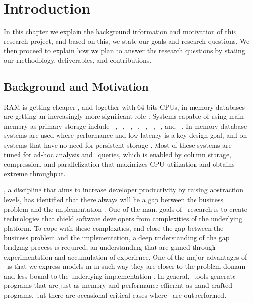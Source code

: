 \chapter{Introduction}
\label{chap:introduction}
In this chapter we explain the background information and motivation of this research project, and based on this, we state our goals and research questions. We then proceed to explain how we plan to answer the research questions by stating our methodology, deliverables, and contributions.
\clearpage

\section{Background and Motivation}
\label{sec:Background and Motivation}
RAM is getting cheaper \cite{Exasol2014-xh}, and together with 64-bits CPUs, in-memory databases are getting an increasingly more significant role \cite{Delaney2014-ip}. Systems capable of using main memory as primary storage include \oracle~\cite{Lahiri2015-mz}, \saph~\cite{Farber2012-vh}, \gorilla~\cite{Pelkonen2015-ko}, \qlikview~\cite{Qlik2011-ef}, \tableau~\cite{Kamkolkar2015-iq}, \monetdb~\cite{Boncz2002-yj}, \blink~\cite{Barber2012-xt}, and \sapnw~\cite{Lemke2010-is}. In-memory database systems are used where performance and low latency is a key design goal, and on systems that have no need for persistent storage \cite{Zicari2012-is}. Most of these systems are tuned for ad-hoc analysis and \bi~queries, which is enabled by column storage, compression, and parallelization that maximizes CPU utilization and obtains extreme throughput.

\mde, a discipline that aims to increase developer productivity by raising abstraction levels, has identified that there always will be a gap between the business problem and the implementation \cite{France2007-ae}. One of the main goals of \mdd~research is to create technologies that shield software developers from complexities of the underlying platform. To cope with these complexities, and close the gap between the business problem and the implementation, a deep understanding of the gap bridging process is required, an understanding that are gained through experimentation and accumulation of experience. One of the major advantages of \mde~is that we express models in in such way they are closer to the problem domain and less bound to the underlying implementation \cite{Selic2003-qa}. In general, \mdd-tools generate programs that are just as memory and performance efficient as hand-crafted programs, but there are occasional critical cases where \mde~are outperformed.

